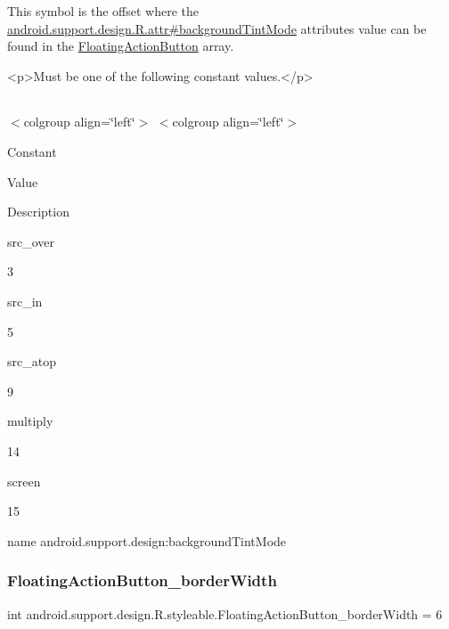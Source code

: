 This symbol is the offset where the \hyperlink{classandroid_1_1support_1_1design_1_1R_1_1attr_a012eb62d26b9f9867a471ece462ff436}{android.\+support.\+design.\+R.\+attr\#background\+Tint\+Mode} attribute\textquotesingle{}s value can be found in the \hyperlink{classandroid_1_1support_1_1design_1_1R_1_1styleable_ac39eabec239d50ec950ae5f013825830}{Floating\+Action\+Button} array.

\begin{DoxyVerb}      <p>Must be one of the following constant values.</p>
\end{DoxyVerb}
 \tabulinesep=1mm
\begin{longtabu} spread 0pt [c]{*{0}{|X[-1]}|}
\hline
\end{longtabu}
$<$colgroup align=\char`\"{}left\char`\"{}$>$ $<$colgroup align=\char`\"{}left\char`\"{}$>$ 

Constant

Value

Description 

{\ttfamily src\+\_\+over}

3

{\ttfamily src\+\_\+in}

5

{\ttfamily src\+\_\+atop}

9

{\ttfamily multiply}

14

{\ttfamily screen}

15

name android.\+support.\+design\+:background\+Tint\+Mode \mbox{\label{classandroid_1_1support_1_1design_1_1R_1_1styleable_a4263e98858725becbfec40a9015c85cc}} 
\subsubsection{\texorpdfstring{Floating\+Action\+Button\+\_\+border\+Width}{FloatingActionButton\_borderWidth}}
{\footnotesize\ttfamily int android.\+support.\+design.\+R.\+styleable.\+Floating\+Action\+Button\+\_\+border\+Width = 6\hspace{0.3cm}{\ttfamily [static]}}

